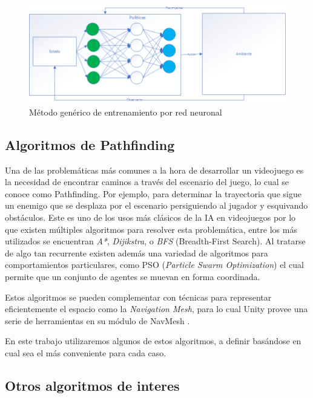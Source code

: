 \documentclass[a4paper]{article}
\begin{document}
\begin{figure}[ht]
    \centering
    \includegraphics[width=1\textwidth]{./images/deep-learning.png}
    \caption{Método genérico de entrenamiento por red neuronal}
    \label{fig:ml}
\end{figure}


\subsection{Algoritmos de Pathfinding}

Una de las problemáticas más comunes a la hora de desarrollar un videojuego es la necesidad de encontrar caminos a través del escenario del juego, lo cual se conoce como Pathfinding. Por ejemplo, para determinar la trayectoria que sigue un enemigo que se desplaza por el escenario persiguiendo al jugador y esquivando obstáculos. Este es uno de los usos más clásicos de la IA en videojuegos por lo que existen múltiples algoritmos para resolver esta problemática, entre los más utilizados se encuentran \textit{A*}, \textit{Dijikstra}, o \textit{BFS} (Breadth-First Search). Al tratarse de algo tan recurrente existen además una variedad de algoritmos para comportamientos particulares, como PSO (\textit{Particle Swarm Optimization}) el cual permite que un conjunto de agentes se muevan en forma coordinada.

Estos algoritmos se pueden complementar con técnicas para representar eficientemente el espacio como la \textit{Navigation Mesh}, para lo cual Unity provee una serie de herramientas en su módulo de NavMesh \cite{unity_artificial_intelligence_programming}.

En este trabajo utilizaremos algunos de estos algoritmos, a definir basándose en cual sea el más conveniente para cada caso.

\subsection{Otros algoritmos de interes}
\end{document}
